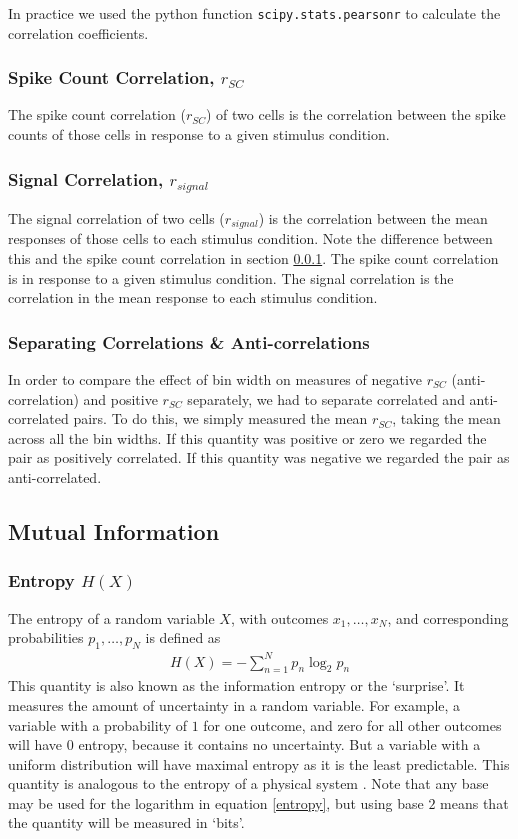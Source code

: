 \documentclass[a4paper,12pt]{article}
\theoremstyle{definition}
\begin{document}
In practice we used the python function \texttt{scipy.stats.pearsonr} to calculate the correlation coefficients.

\subsubsection{Spike Count Correlation, $r_{SC}$}\label{sec:spike_count_correlation}
The spike count correlation ($r_{SC}$) of two cells is the correlation between the spike counts of those cells in response to a given stimulus condition.

\subsubsection{Signal Correlation, $r_{signal}$}
The signal correlation of two cells ($r_{signal}$) is the correlation between the mean responses of those cells to each stimulus condition. Note the difference between this and the spike count correlation in section \ref{sec:spike_count_correlation}. The spike count correlation is in response to a given stimulus condition. The signal correlation is the correlation in the mean response to each stimulus condition.

\subsubsection{Separating Correlations \& Anti-correlations}\label{sec:corr_anti_corr}
In order to compare the effect of bin width on measures of negative $r_{SC}$ (anti-correlation) and positive $r_{SC}$ separately, we had to separate correlated and anti-correlated pairs. To do this, we simply measured the mean $r_{SC}$, taking the mean across all the bin widths. If this quantity was positive or zero we regarded the pair as positively correlated. If this quantity was negative we regarded the pair as anti-correlated.

\subsection{Mutual Information}
\subsubsection{Entropy $H(X)$}
The entropy of a random variable $X$, with outcomes $x_1, \dots, x_N$, and corresponding probabilities $p_1, \dots, p_N$ is defined as
\begin{align}\label{entropy}
H(X) = -\sum_{n=1}^N p_n \log _2 p_n
\end{align}
This quantity is also known as the information entropy or the `surprise'. It measures the amount of uncertainty in a random variable. For example, a variable with a probability of $1$ for one outcome, and zero for all other outcomes will have 0 entropy, because it contains no uncertainty. But a variable with a uniform distribution will have maximal entropy as it is the least predictable. This quantity is analogous to the entropy of a physical system \cite{shannon}. Note that any base may be used for the logarithm in equation \ref{entropy}, but using base $2$ means that the quantity will be measured in `bits'.
\end{document}
